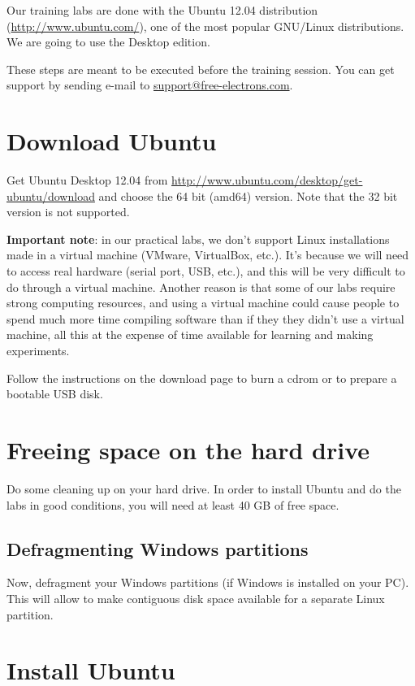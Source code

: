 
Our training labs are done with the Ubuntu 12.04 distribution
(\url{http://www.ubuntu.com/}), one of the most popular GNU/Linux distributions. We
are going to use the Desktop edition.

These steps are meant to be executed before the training session. You can get
support by sending e-mail to \href{mailto:
support@free-electrons.com}{support@free-electrons.com}.

\section{Download Ubuntu}

Get Ubuntu Desktop 12.04 from
\url{http://www.ubuntu.com/desktop/get-ubuntu/download} and choose the
64 bit (amd64) version. Note that the 32 bit version is not supported.

{\bf Important note}: in our practical labs, we don't support Linux installations made
in a virtual machine (VMware, VirtualBox, etc.). It's because we will need to
access real hardware (serial port, USB, etc.), and this will be very difficult
to do through a virtual machine. Another reason is that some of our labs
require strong computing resources, and using a virtual machine could
cause people to spend much more time compiling software than if they they
didn't use a virtual machine, all this at the expense of time available
for learning and making experiments.

Follow the instructions on the download page to burn a cdrom or to
prepare a bootable USB disk.

\section{Freeing space on the hard drive}

Do some cleaning up on your hard drive. In order to install Ubuntu and do the
labs in good conditions, you will need at least 40 GB of free space.

\subsection{Defragmenting Windows partitions}
Now, defragment your Windows partitions (if Windows is installed on your
PC). This will allow to make contiguous disk space available for a separate
Linux partition.

\section{Install Ubuntu}

